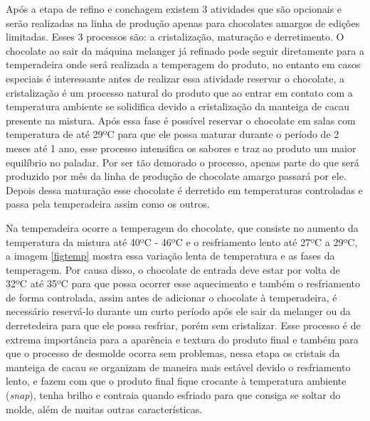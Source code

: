 \documentclass[
	12pt,				%
	openright,			%
	oneside,			%
	a4paper,			%
	english,			%
	french,				%
	spanish,			%
	brazil				%
	]{abntex2}
\begin{document}
Após a etapa de refino e conchagem existem 3 atividades que são opcionais e serão realizadas na linha de produção apenas para chocolates amargos de edições limitadas. Esses 3 processos são: a cristalização, maturação e derretimento. O chocolate ao sair da máquina melanger já refinado pode seguir diretamente para a temperadeira onde será realizada a temperagem do produto, no entanto em casos especiais é interessante antes de realizar essa atividade reservar o chocolate, a cristalização é um processo natural do produto que ao entrar em contato com a temperatura ambiente se solidifica devido a cristalização da manteiga de cacau presente na mistura. Após essa fase é possível reservar o chocolate em salas com temperatura de até 29ºC para que ele possa maturar durante o período de 2 meses até 1 ano, esse processo intensifica os sabores e traz ao produto um maior equilíbrio no paladar. Por ser tão demorado o processo, apenas parte do que será produzido por mês da linha de produção de chocolate amargo passará por ele. Depois dessa maturação esse chocolate é derretido em temperaturas controladas e passa pela temperadeira assim como os outros.

Na temperadeira ocorre a temperagem do chocolate, que consiste no aumento da temperatura da mistura até 40ºC - 46ºC e o resfriamento lento até 27ºC a 29ºC, a imagem \ref{figtemp} mostra essa variação lenta de temperatura e as fases da temperagem. Por causa disso, o chocolate de entrada deve estar por volta de 32ºC até 35ºC para que possa ocorrer esse aquecimento e também o resfriamento de forma controlada, assim antes de adicionar o chocolate à temperadeira, é necessário reservá-lo durante um curto período após ele sair da melanger ou da derretedeira para que ele possa resfriar, porém sem cristalizar. Esse processo é de extrema importância para a aparência e textura do produto final e também para que o processo de desmolde ocorra sem problemas, nessa etapa os cristais da manteiga de cacau se organizam de maneira mais estável devido o resfriamento lento, e fazem com que o produto final fique crocante à temperatura ambiente (\textit{snap}), tenha brilho e contraia quando esfriado para que consiga se soltar do molde, além de muitas outras características.
\end{document}
